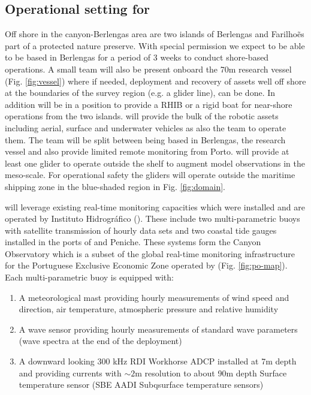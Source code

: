 \subsection{Operational setting for \proj}

Off shore in the \naz canyon-Berlengas area are two islands of
Berlengas and Farilho\~es part of a protected nature preserve. With
special permission we expect to be able to be based in Berlengas for a
period of 3 weeks to conduct shore-based operations. A small team will
also be present onboard the 70m \inst research vessel
(Fig. \ref{fig:vessel}) where if needed, deployment and recovery of
assets well off shore at the boundaries of the survey region (e.g. a
glider line), can be done. In addition \inst will be in a position to
provide a RHIB or a rigid boat for near-shore operations from the two
islands. \univ will provide the bulk of the robotic assets including
aerial, surface and underwater vehicles as also the team to operate
them. The team will be split between being based in Berlengas, the
research vessel and also provide limited remote monitoring from
Porto. \soc will provide at least one glider to operate outside the
shelf to augment model observations in the meso-scale. For operational
safety the gliders will operate outside the maritime shipping zone in
the blue-shaded region in Fig. \ref{fig:domain}.

\proj will leverage existing real-time monitoring capacities which
were installed and are operated by Instituto Hidrogr\'{a}fico
(\inste). These include two multi-parametric buoys with satellite
transmission of hourly data sets and two coastal tide gauges installed
in the ports of \naz and Peniche. These systems form the \naz Canyon
Observatory which is a subset of the global real-time monitoring
infrastructure for the Portuguese Exclusive Economic Zone operated by
\inst (Fig. \ref{fig:po-map}). %
Each multi-parametric buoy is equipped with:

\begin{enumerate}[noitemsep,topsep=0pt,parsep=0pt,partopsep=0pt]

  \item A meteorological mast providing hourly measurements of wind speed and
    direction, air temperature, atmospheric pressure and relative
    humidity

  \item A wave sensor providing hourly measurements of standard wave parameters
    (wave spectra at the end of the deployment)

  \item A downward looking 300 kHz RDI Workhorse ADCP installed at 7m
    depth and providing currents with $\sim 2$m resolution to about 90m
    depth Surface temperature sensor (SBE AADI Subqsurface temperature
    sensors)

\end{enumerate}  

